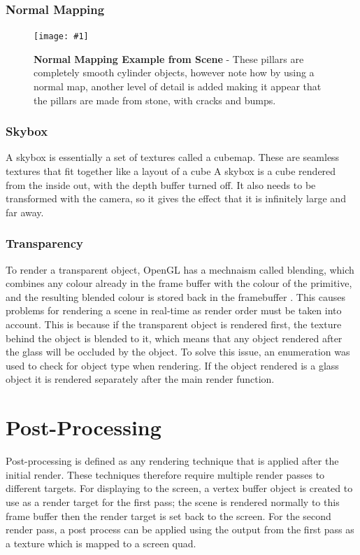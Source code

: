 \documentclass[conference]{acmsiggraph}
\newcommand{\figuremacroW}[4]{
\begin{figure}[h] %
	\centering
	\texttt{[image: \#1]}
	\caption[#2]{\textbf{#2} - #3}
	\label{fig:#1}
\end{figure}
}
\begin{document}
\subsubsection{Normal Mapping}
\figuremacroW
{normalMap}
{Normal Mapping Example from Scene}
{These pillars are completely smooth cylinder objects, however note how by using a normal map, another level of detail is added making it appear that the pillars are made from stone, with cracks and bumps.}
{1.0}
	
\subsubsection{Skybox}
A skybox is essentially a set of textures called a cubemap. These are seamless textures that fit together like a layout of a cube
A skybox is a cube rendered from the inside out, with the depth buffer turned off. It also needs to be transformed with the camera, so it gives the effect that it is infinitely large and far away.
	
\subsubsection{Transparency}
	
To render a transparent object, OpenGL has a mechnaism called blending, which combines any colour already in the frame buffer with the colour of the primitive, and the resulting blended colour is stored back in the framebuffer \cite{openGLBlend}. This causes problems for rendering a scene in real-time as render order must be taken into account. This is because if the transparent object is rendered first, the texture behind the object is blended to it, which means that any object rendered after the glass will be occluded by the object.
To solve this issue, an enumeration was used to check for object type when rendering. If the object rendered is a glass object it is rendered separately after the main render function.
	
\section{Post-Processing}
	
Post-processing is defined as any rendering technique that is applied after the initial render. These techniques therefore require multiple render passes to different targets. For displaying to the screen, a vertex buffer object is created to use as a render target for the first pass; the scene is rendered normally to this frame buffer then the render target is set back to the screen. For the second render pass, a post process can be applied using the output from the first pass as a texture which is mapped to a screen quad.
	
\end{document}
